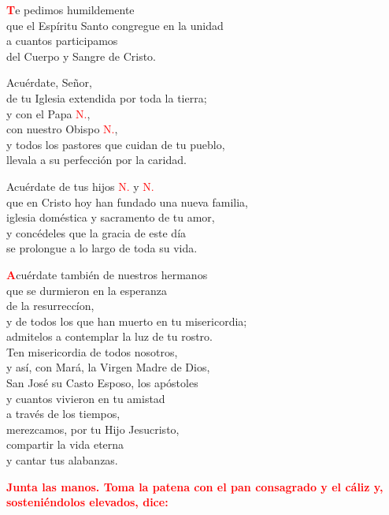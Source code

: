 \documentclass[12pt, letterpaper, spanish]{report}
\begin{document}
\lettrine[lines=1]{\bfseries \textcolor{red}{T}}{}e pedimos humildemente\\
que el Esp\'iritu Santo congregue en la unidad\\
a cuantos participamos\\
del Cuerpo y Sangre de Cristo.\newline

Acu\'erdate, Se\~nor,\\
de tu Iglesia extendida por toda la tierra; \\
y con el Papa \textcolor{red}{N.},\\
con nuestro Obispo \textcolor{red}{N.},\\
y todos los pastores que cuidan de tu pueblo,\\
llevala a su perfecci\'on por la caridad.\newline

Acu\'erdate de tus hijos \textcolor{red}{N.} y \textcolor{red}{N.} \\
que en Cristo hoy han fundado una nueva familia, \\
iglesia dom\'estica y sacramento de tu amor, \\
y conc\'edeles que la gracia de este d\'ia \\
se prolongue a lo largo de toda su vida.

\lettrine[lines=1]{\bfseries \textcolor{red}{A}}{}cu\'erdate tambi\'en de nuestros hermanos\\
que se durmieron en la esperanza\\
de la resurrecc\'ion,\\
y de todos los que han muerto en tu misericordia;\\
admitelos a contemplar la luz de tu rostro.\\
Ten misericordia de todos nosotros,\\
y as\'i, con Mar\'a, la Virgen Madre de Dios,\\
San Jos\'e su Casto Esposo, los ap\'ostoles\\
y cuantos vivieron en tu amistad\\
a trav\'es de los tiempos,\\
merezcamos, por tu Hijo Jesucristo,\\
compartir la vida eterna\\
y cantar tus alabanzas. \newline

\large{\bfseries \textcolor{red}{Junta las manos. Toma la patena con el pan consagrado y el c\'aliz y, sosteni\'endolos elevados, dice:}}
\end{document}

